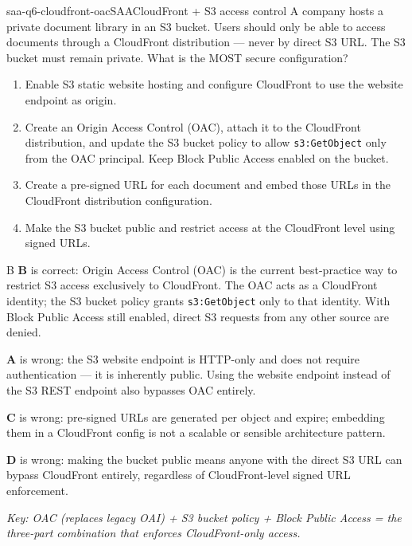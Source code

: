 \begin{question}{saa-q6-cloudfront-oac}{SAA}{CloudFront + S3 access control}
A company hosts a private document library in an S3 bucket. Users should only be able to access documents through a CloudFront distribution --- never by direct S3 URL. The S3 bucket must remain private. What is the MOST secure configuration?

\begin{enumerate}[label=\Alph*.]
  \item Enable S3 static website hosting and configure CloudFront to use the website endpoint as origin.
  \item Create an Origin Access Control (OAC), attach it to the CloudFront distribution, and update the S3 bucket policy to allow \texttt{s3:GetObject} only from the OAC principal. Keep Block Public Access enabled on the bucket.
  \item Create a pre-signed URL for each document and embed those URLs in the CloudFront distribution configuration.
  \item Make the S3 bucket public and restrict access at the CloudFront level using signed URLs.
\end{enumerate}
\end{question}

\begin{answer}{B}
\textbf{B} is correct: Origin Access Control (OAC) is the current best-practice way to restrict S3 access exclusively to CloudFront. The OAC acts as a CloudFront identity; the S3 bucket policy grants \texttt{s3:GetObject} only to that identity. With Block Public Access still enabled, direct S3 requests from any other source are denied.

\textbf{A} is wrong: the S3 website endpoint is HTTP-only and does not require authentication --- it is inherently public. Using the website endpoint instead of the S3 REST endpoint also bypasses OAC entirely.

\textbf{C} is wrong: pre-signed URLs are generated per object and expire; embedding them in a CloudFront config is not a scalable or sensible architecture pattern.

\textbf{D} is wrong: making the bucket public means anyone with the direct S3 URL can bypass CloudFront entirely, regardless of CloudFront-level signed URL enforcement.

\textit{Key: OAC (replaces legacy OAI) + S3 bucket policy + Block Public Access = the three-part combination that enforces CloudFront-only access.}
\end{answer}

